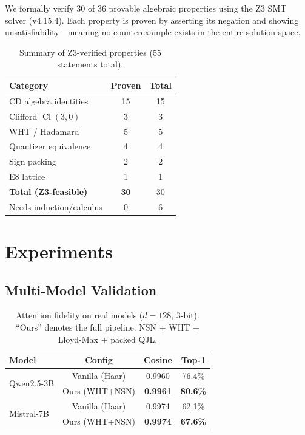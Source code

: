 \documentclass[letterpaper,11pt]{article}
\DeclareMathOperator{\Cl}{Cl}
\begin{document}
We formally verify 30 of 36 provable algebraic properties using
the Z3 SMT solver (v4.15.4). Each property is proven by asserting
its negation and showing unsatisfiability---meaning no counterexample
exists in the entire solution space.

\begin{table}[ht]
\centering
\caption{Summary of Z3-verified properties (55 statements total).}
\label{tab:z3}
\begin{tabular}{lcc}
\toprule
Category & Proven & Total \\
\midrule
CD algebra identities & 15 & 15 \\
Clifford $\Cl(3,0)$ & 3 & 3 \\
WHT / Hadamard & 5 & 5 \\
Quantizer equivalence & 4 & 4 \\
Sign packing & 2 & 2 \\
E8 lattice & 1 & 1 \\
\midrule
\textbf{Total (Z3-feasible)} & \textbf{30} & 30 \\
Needs induction/calculus & 0 & 6 \\
\bottomrule
\end{tabular}
\end{table}

\section{Experiments}
\label{sec:experiments}

\subsection{Multi-Model Validation}

\begin{table}[ht]
\centering
\caption{Attention fidelity on real models ($d=128$, 3-bit). ``Ours'' denotes
the full pipeline: NSN + WHT + Lloyd-Max + packed QJL.}
\label{tab:models}
\begin{tabular}{lccc}
\toprule
Model & Config & Cosine & Top-1 \\
\midrule
\multirow{2}{*}{Qwen2.5-3B} & Vanilla (Haar) & 0.9960 & 76.4\% \\
                              & Ours (WHT+NSN) & \textbf{0.9961} & \textbf{80.6\%} \\
\midrule
\multirow{2}{*}{Mistral-7B}  & Vanilla (Haar) & 0.9974 & 62.1\% \\
                              & Ours (WHT+NSN) & \textbf{0.9974} & \textbf{67.6\%} \\
\bottomrule
\end{tabular}
\end{table}
\end{document}
